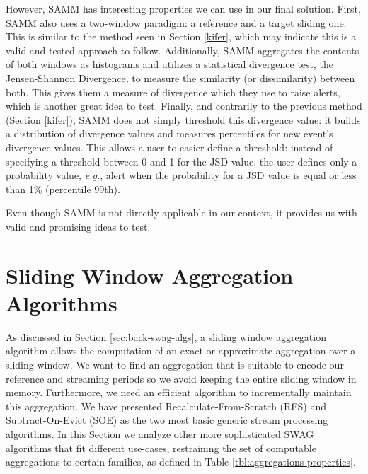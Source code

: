 However, SAMM has interesting properties we can use in our final solution. First, SAMM also uses a two-window paradigm: a reference and a target sliding one. This is similar to the method seen in Section \ref{kifer}, which may indicate this is a valid and tested approach to follow. Additionally, SAMM aggregates the contents of both windows as histograms and utilizes a statistical divergence test, the Jensen-Shannon Divergence, to measure the similarity (or dissimilarity) between both. This gives them a measure of divergence which they use to raise alerts, which is another great idea to test. Finally, and contrarily to the previous method (Section \ref{kifer}), SAMM does not simply threshold this divergence value: it builds a distribution of divergence values and measures percentiles for new event's divergence values. This allows a user to easier define a threshold: instead of specifying a threshold between 0 and 1 for the JSD value, the user defines only a probability value, \textit{e.g.}, alert when the probability for a JSD value is equal or less than 1\% (percentile 99th).

Even though SAMM is not directly applicable in our context, it provides us with valid and promising ideas to test.


\section{Sliding Window Aggregation Algorithms} \label{sec:sota-swag-algs}

As discussed in Section \ref{sec:back-swag-algs}, a sliding window aggregation algorithm allows the computation of an exact or approximate aggregation over a sliding window. We want to find an aggregation that is suitable to encode our reference and streaming periods so we avoid keeping the entire sliding window in memory. Furthermore, we need an efficient algorithm to incrementally maintain this aggregation. We have presented Recalculate-From-Scratch (RFS) and Subtract-On-Evict (SOE) as the two most basic generic stream processing algorithms. In this Section we analyze other more sophisticated SWAG algorithms that fit different use-cases, restraining the set of computable aggregations to certain families, as defined in Table \ref{tbl:aggregations-properties}.

